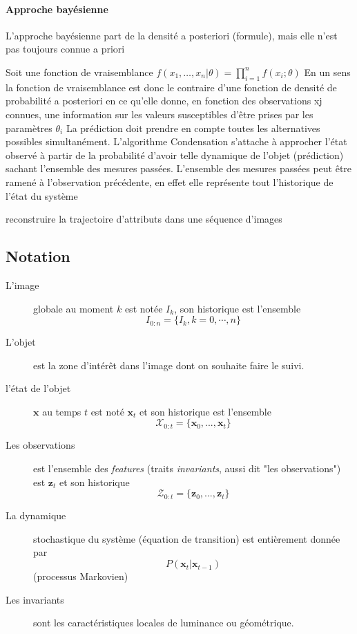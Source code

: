 \documentclass[a4paper,12pt]{report}
\begin{document}
\paragraph{Approche bayésienne}
L'approche bayésienne part de la densité a posteriori (formule), mais elle n'est pas toujours connue a priori

Soit une fonction de vraisemblance $f(x_1, \ldots , x_n | \theta) = \prod_{i=1}^{n} f(x_i ; \theta)  $
En un sens la fonction de vraisemblance est donc le contraire d'une fonction de densité de probabilité a posteriori en ce qu'elle donne, en fonction des observations xj connues, une information sur les valeurs susceptibles d'être prises par les paramètres $\theta_i$
La prédiction doit prendre en compte toutes les alternatives possibles simultanément.
L'algorithme Condensation s'attache à approcher l'état observé à partir de la probabilité d'avoir telle dynamique de l'objet (prédiction) sachant l'ensemble des mesures passées. L'ensemble des mesures passées peut être ramené à l'observation précédente, en effet elle représente tout l'historique de l'état du système 

  
reconstruire la trajectoire d'attributs dans une séquence d'images \\
\subsection{Notation}
\begin{description}
\item[L'image] globale au moment $k$ est notée $I_k$, son historique est l'ensemble $$I_{0:n}=\{I_k, k=0,\cdots,n\}$$
\item[L'objet] est la zone d'intérêt dans l'image dont on souhaite faire le suivi.
\item[l'état de l'objet] $\mathbf{x}$ au temps $t$ est noté $\mathbf{x}_t$ et son historique est l'ensemble $$\mathcal{X}_{0:t} = \{\mathbf{x}_0,...,\mathbf{x}_t\}$$
\item[Les observations] est l'ensemble des \textit{features} (traits \textit{invariants}, aussi dit "les observations") est $\mathbf{z}_t$ et son historique $$ \mathcal{Z}_{0:t}=\{\mathbf{z}_0,...,\mathbf{z}_t\}$$
\item[La dynamique] stochastique du système (équation de transition) est entièrement donnée par $$P(\mathbf{x}_t|\mathbf{x}_{t-1})$$ (processus Markovien)
\item[Les invariants] sont les caractéristiques locales de luminance ou géométrique.
\end{description}
\end{document}
